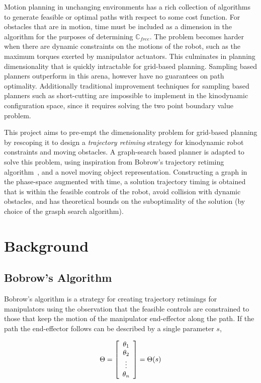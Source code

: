 \documentclass[letterpaper,12pt]{article} %
\begin{document}
Motion planning in unchanging environments has a rich collection of algorithms to generate feasible or optimal paths with respect to some cost function. For obstacles that are in motion, time must be included as a dimension in the algorithm for the purposes of determining $\mathbb{C}_{free}$. The problem becomes harder when there are dynamic constraints on the motions of the robot, such as the maximum torques exerted by manipulator actuators. This culminates in planning dimensionality that is quickly intractable for grid-based planning. Sampling based planners outperform in this arena, however have no guarantees on path optimality. Additionally traditional improvement techniques for sampling based planners such as short-cutting are impossible to implement in the kinodynamic configuration space, since it requires solving the two point boundary value problem.

This project aims to pre-empt the dimensionality problem for grid-based planning by rescoping it to design a \emph{trajectory retiming} strategy for kinodynamic robot constraints and moving obstacles. A graph-search based planner is adapted to solve this problem, using inspiration from Bobrow's trajectory retiming algorithm~\cite{bobrow1985time}, and a novel moving object representation. Constructing a graph in the phase-space augmented with time, a solution trajectory timing is obtained that is within the feasible controls of the robot, avoid collision with dynamic obstacles, and has theoretical bounds on the suboptimality of the solution (by choice of the grasph search algorithm).

\section{Background}\label{sec:framework}

\subsection{Bobrow's Algorithm}\label{subsec:bobrow}

Bobrow's algorithm is a strategy for creating trajectory retimings for manipulators using the observation that the feasible controls are constrained to those that keep the motion of the manipulator end-effector along the path. If the path the end-effector follows can be described by a single parameter $s$, 

\begin{equation}
\Theta = \left[ \begin{array}{c} \theta_1 \\ \theta_2 \\ \vdots \\ \theta_n \end{array} \right] = \Theta(s) \\
\end{equation}
\end{document}
